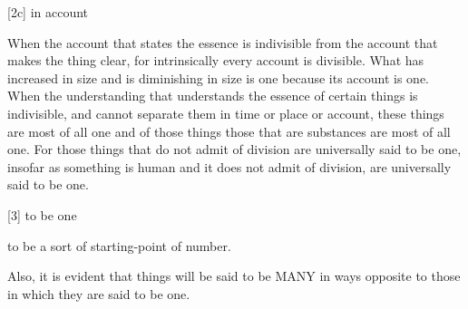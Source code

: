 [2c]    in account

        When the account that states the essence is indivisible from the account
        that makes the thing clear, for intrinsically every account is divisible.
        What has increased in size and is diminishing in size is one
        because its account is one.
        When the understanding that understands the essence of certain things is 
        indivisible, and cannot separate them in time or place or account,
        these things are most of all one and of those things those that are
        substances are most of all one.
        For those things that do not admit of division are universally said to be one,
        insofar as something is human and it does not admit of division, are universally
        said to be one.

[3] to be one

        to be a sort of starting-point of number.


Also, it is evident that things will be said to be MANY in ways opposite to those
in which they are said to be one.